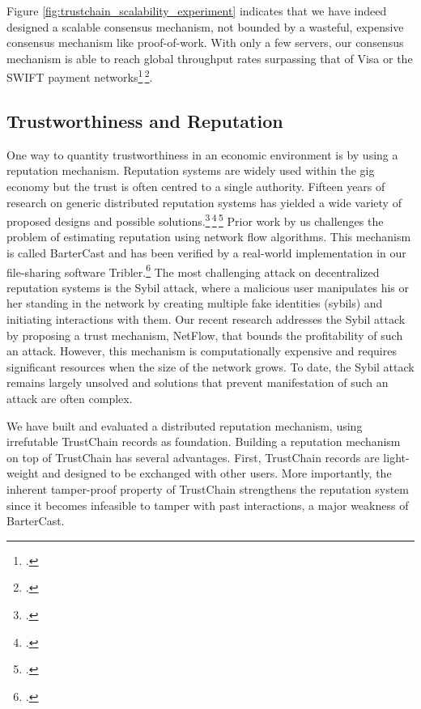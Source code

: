 \documentclass[USenglish]{article}
\begin{document}
Figure \ref{fig:trustchain_scalability_experiment} indicates that we have indeed designed a scalable consensus mechanism, not bounded by a wasteful, expensive consensus mechanism like proof-of-work.
With only a few servers, our consensus mechanism is able to reach global throughput rates surpassing that of Visa or the SWIFT payment networks\footcite{visatransactions}\,\footcite{swifttransactions}.

\subsection{Trustworthiness and Reputation}
\label{sec:reputation}
One way to quantity trustworthiness in an economic environment is by using a reputation mechanism.
Reputation systems are widely used within the gig economy but the trust is often centred to a single authority.
Fifteen years of research on generic distributed reputation systems has yielded a wide variety of proposed designs and possible solutions.\footcite{delaviz2010improving}\,\footcite{delaviz2012sybilres}\,\footcite{kamvar2003eigentrust}
Prior work by us challenges the problem of estimating reputation using network flow algorithms.
This mechanism is called BarterCast and has been verified by a real-world implementation in our file-sharing software Tribler.\footcite{meulpolder2009bartercast}
The most challenging attack on decentralized reputation systems is the Sybil attack, where a malicious user manipulates his or her standing in the network by creating multiple fake identities (sybils) and initiating interactions with them.
Our recent research addresses the Sybil attack by proposing a trust mechanism, NetFlow, that bounds the profitability of such an attack.
However, this mechanism is computationally expensive and requires significant resources when the size of the network grows.
To date, the Sybil attack remains largely unsolved and solutions that prevent manifestation of such an attack are often complex.

We have built and evaluated a distributed reputation mechanism, using irrefutable TrustChain records as foundation.
Building a reputation mechanism on top of TrustChain has several advantages.
First, TrustChain records are light-weight and designed to be exchanged with other users.
More importantly, the inherent tamper-proof property of TrustChain strengthens the reputation system since it becomes infeasible to tamper with past interactions, a major weakness of BarterCast.
\end{document}
